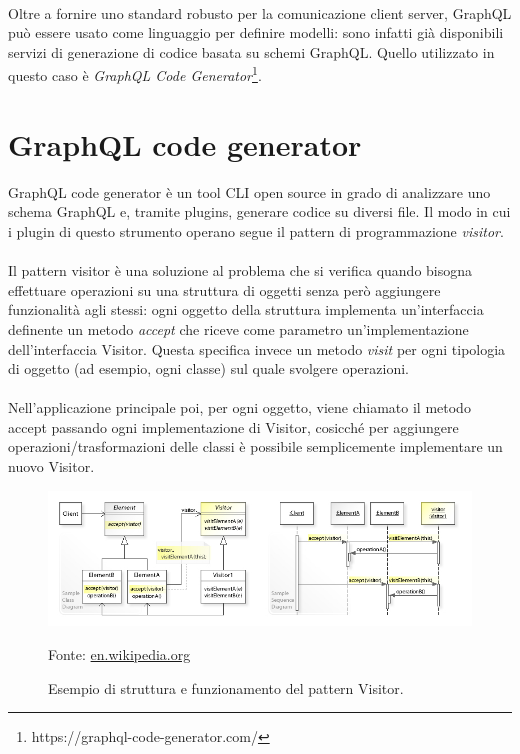 \documentclass[a4paper, 12pt]{report}
\newcommand{\source}[1]{\caption*{Fonte: {#1}}}
\begin{document}
        \paragraph*{}
          Oltre a fornire uno standard robusto per la comunicazione client server, GraphQL può essere usato come linguaggio per definire modelli: sono infatti già disponibili servizi di generazione di codice basata su schemi GraphQL.
          Quello utilizzato in questo caso è \emph{GraphQL Code Generator}\footnote{https://graphql-code-generator.com/}.
    \section{GraphQL code generator}
      GraphQL code generator è un tool CLI open source in grado di analizzare uno schema GraphQL e, tramite plugins, generare codice su diversi file.
      Il modo in cui i plugin di questo strumento operano segue il pattern di programmazione \emph{visitor}.
      \paragraph*{}
        Il pattern visitor è una soluzione al problema che si verifica quando bisogna effettuare operazioni su una struttura di oggetti senza però aggiungere funzionalità agli stessi:
        ogni oggetto della struttura implementa un'interfaccia definente un metodo \emph{accept} che riceve come parametro un'implementazione dell'interfaccia Visitor.
        Questa specifica invece un metodo \emph{visit} per ogni tipologia di oggetto (ad esempio, ogni classe) sul quale svolgere operazioni.
      \paragraph*{}
        Nell'applicazione principale poi, per ogni oggetto, viene chiamato il metodo accept passando ogni implementazione di Visitor, cosicché per aggiungere operazioni/trasformazioni delle classi è possibile semplicemente implementare un nuovo Visitor.
      \begin{figure}[H]
          \includegraphics[width=\textwidth]{visitor-example.jpg}
          \caption{Esempio di struttura e funzionamento del pattern Visitor.}
          \source{\href{https://en.wikipedia.org/wiki/Visitor_pattern}{en.wikipedia.org}}
      \end{figure}
\end{document}
